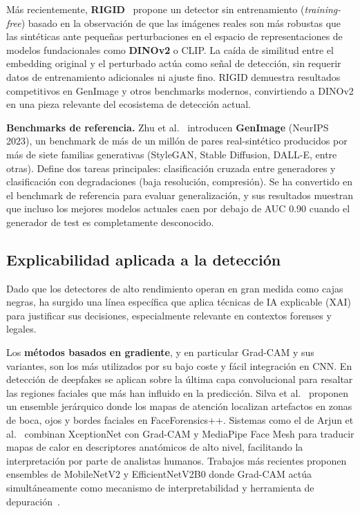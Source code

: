 \documentclass[12pt,a4paper,twoside]{article}
\begin{document}
Más recientemente, \textbf{RIGID}~\cite{rigid2024} propone un detector sin
entrenamiento (\textit{training-free}) basado en la observación de que las imágenes
reales son más robustas que las sintéticas ante pequeñas perturbaciones en el
espacio de representaciones de modelos fundacionales como \textbf{DINOv2} o CLIP.
La caída de similitud entre el embedding original y el perturbado actúa como señal
de detección, sin requerir datos de entrenamiento adicionales ni ajuste fino. RIGID
demuestra resultados competitivos en GenImage y otros benchmarks modernos,
convirtiendo a DINOv2 en una pieza relevante del ecosistema de detección actual.

\textbf{Benchmarks de referencia.} Zhu et al.~\cite{zhu2023genimage} introducen
\textbf{GenImage} (NeurIPS 2023), un benchmark de más de un millón de pares
real-sintético producidos por más de siete familias generativas (StyleGAN,
Stable Diffusion, DALL-E, entre otras). Define dos tareas principales: clasificación
cruzada entre generadores y clasificación con degradaciones (baja resolución,
compresión). Se ha convertido en el benchmark de referencia para evaluar
generalización, y sus resultados muestran que incluso los mejores modelos actuales
caen por debajo de AUC 0.90 cuando el generador de test es completamente desconocido.

\subsection{Explicabilidad aplicada a la detección}

Dado que los detectores de alto rendimiento operan en gran medida como cajas negras,
ha surgido una línea específica que aplica técnicas de IA explicable (XAI) para
justificar sus decisiones, especialmente relevante en contextos forenses y legales.

Los \textbf{métodos basados en gradiente}, y en particular Grad-CAM y sus variantes,
son los más utilizados por su bajo coste y fácil integración en CNN. En detección de
deepfakes se aplican sobre la última capa convolucional para resaltar las regiones
faciales que más han influido en la predicción. Silva et al.~\cite{silva2022}
proponen un ensemble jerárquico donde los mapas de atención localizan artefactos en
zonas de boca, ojos y bordes faciales en FaceForensics++. Sistemas como el de Arjun
et al.~\cite{arjun2023xception} combinan XceptionNet con Grad-CAM y MediaPipe Face
Mesh para traducir mapas de calor en descriptores anatómicos de alto nivel,
facilitando la interpretación por parte de analistas humanos. Trabajos más recientes
proponen ensembles de MobileNetV2 y EfficientNetV2B0 donde Grad-CAM actúa
simultáneamente como mecanismo de interpretabilidad y herramienta de
depuración~\cite{gradcam_mobile}.
\end{document}

